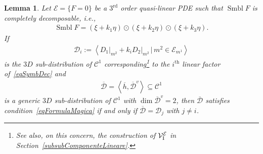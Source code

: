 \documentclass[10pt,a4paper]{amsart}
\newcommand{\C}{\mathcal{C}}
\newcommand{\D}{\mathcal{D}}
\newcommand{\MM}{\mathcal{V}_{\textrm{\normalfont I}}}
\newcommand{\E}{\mathcal{E}}
\newcommand{\Span}[1]{\left\langle #1 \right\rangle}
\newcommand{\Th}{^\textrm{th}}
\newcommand{\Rd}{^\textrm{rd}}
\numberwithin{equation}{section}
\newtheorem{Lemma}[Theorem]{Lemma}
\begin{document}
\begin{Lemma}\label{LemmaCalcolosoByGiovanni}
 Let $\E=\{F=0\}$ be a $3\Rd$ order quasi-linear PDE such that $\operatorname{Smbl} F$ is completely decomposable, i.e.,
 \begin{gather}\label{eqSymbDec}
\operatorname{Smbl} F=(\xi+k_1\eta)\odot(\xi+k_2\eta)\odot(\xi+k_3\eta).
\end{gather}
If
 \begin{gather}\label{eqDi}
\D_i:=\Span{\left. D_1\right|_{m^2}+k_i\left. D_2\right|_{m^2}\,|\, m^2\in \E_{m^1}}
\end{gather}
is the $3D$ sub-distribution of $\C^1$ corresponding\footnote{See also, on this concern, the construction of $\MM^\E$ in Section~\ref{subsubComponenteLineare}.} to the $i\Th$ linear factor of~\eqref{eqSymbDec} and
\begin{gather}\label{eqDiPrimo}
\overline{\D}=\Span{\overline{h},\overline{\D}^v}\subseteq\C^1
\end{gather}
is a generic $3D$ sub-distribution of $\C^1$ with $\dim \overline{\D}^v=2$, then $\overline{\D} $
 satisfies condition~\eqref{eqFormulaMagica} if and only if $\overline{\D}=\D_j$ with $j\neq i$.
\end{Lemma}
\end{document}
